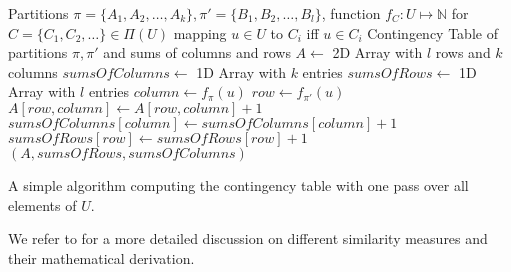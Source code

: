 		\begin{algorithm}[ht!]
			\centering
			\begin{algorithmic}
				\Require Partitions $\pi = \{ A_1, A_2, \ldots, A_k \}, \pi' = \{ B_1, B_2, \ldots, B_l \}$, function $f_C: U \mapsto \mathbb{N}$ for $C = \{ C_1, C_2, \ldots \} \in \Pi(U)$ mapping $u \in U$ to $C_i$ iff $u \in C_i$
				\Ensure Contingency Table of partitions $\pi, \pi'$ and sums of columns and rows
				\Statex
					\State $A \gets$ 2D Array with $l$ rows and $k$ columns
					\State $sumsOfColumns \gets$ 1D Array with $k$ entries
					\State $sumsOfRows \gets$ 1D Array with $l$ entries
						\State $column \gets f_\pi(u)$
						\State $row \gets f_{\pi'}(u)$
						\Statex
						\State $A[row, column] \gets A[row, column] + 1$
						\State $sumsOfColumns[column] \gets sumsOfColumns[column] + 1$
						\State $sumsOfRows[row] \gets sumsOfRows[row] + 1$
					\EndFor
					\State \Return $(A, sumsOfRows, sumsOfColumns)$
				\EndFunction
			\end{algorithmic}
			\caption{A simple algorithm computing the contingency table with one pass over all elements of $U$.}
			\label{algo:prelims:rand:contingency}
		\end{algorithm}
		
		We refer to \cite{warrensUnderstandingAdjustedRand2022} for a more detailed discussion on different similarity measures and their mathematical derivation.
		
